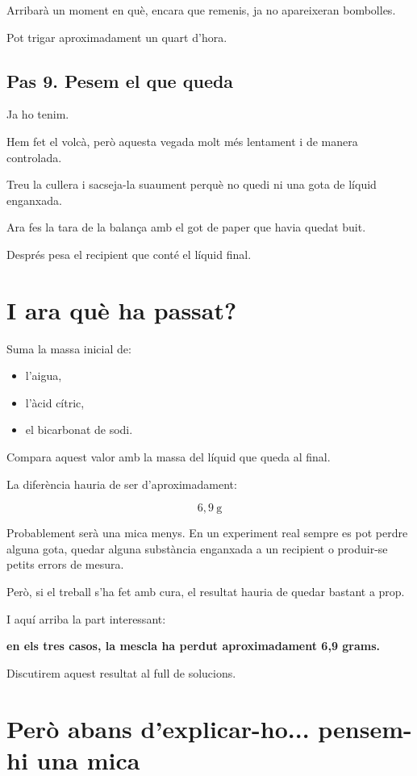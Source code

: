 Arribarà un moment en què, encara que remenis, ja no apareixeran bombolles.

Pot trigar aproximadament un quart d'hora.

\subsection{Pas 9. Pesem el que queda}

Ja ho tenim.

Hem fet el volcà, però aquesta vegada molt més lentament i de manera controlada.

Treu la cullera i sacseja-la suaument perquè no quedi ni una gota de líquid enganxada.

Ara fes la tara de la balança amb el got de paper que havia quedat buit.

Després pesa el recipient que conté el líquid final.

\vfill
\newpage

\section{I ara què ha passat?}

Suma la massa inicial de:

\begin{itemize}
    \item l'aigua,
    \item l'àcid cítric,
    \item el bicarbonat de sodi.
\end{itemize}

Compara aquest valor amb la massa del líquid que queda al final.

La diferència hauria de ser d'aproximadament:

\[
6,9\ \text{g}
\]

Probablement serà una mica menys. En un experiment real sempre es pot perdre alguna gota, quedar alguna substància enganxada a un recipient o produir-se petits errors de mesura.

Però, si el treball s'ha fet amb cura, el resultat hauria de quedar bastant a prop.

I aquí arriba la part interessant:

\textbf{en els tres casos, la mescla ha perdut aproximadament 6,9 grams.}

Discutirem aquest resultat al full de solucions.

\section{Però abans d'explicar-ho... pensem-hi una mica}

